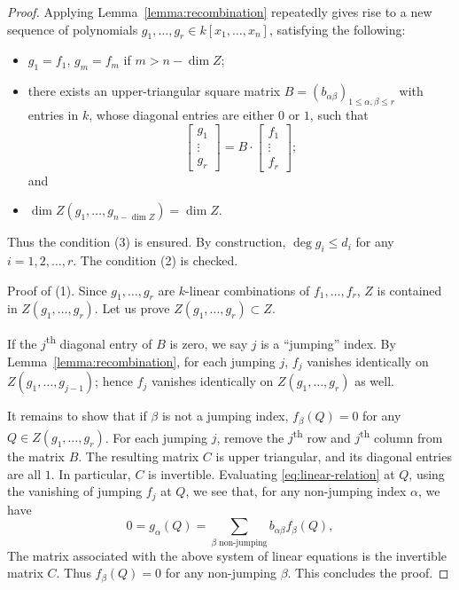 \documentclass{amsart}
\numberwithin{equation}{section}
\theoremstyle{plain}
\theoremstyle{definition}
\begin{document}
\begin{proof}
  Applying Lemma~\ref{lemma:recombination}
  repeatedly gives rise to a new sequence of polynomials
  \(g_1,\ldots,g_r \in k[x_1,\ldots,x_n]\), satisfying the following:
  \begin{itemize}
  \item
    \(g_1 = f_1\),
    \(g_m = f_m\) if \(m > n-\dim Z\);
  \item there exists an upper-triangular square matrix
    \(B = (b_{\alpha\beta})_{1\leq \alpha,\beta\leq r}\) with entries in \(k\),
    whose diagonal entries are either \(0\) or \(1\), such that
    \begin{equation}\label{eq:linear-relation}
      \begin{bmatrix}
        g_1 \\ \vdots \\ g_r
      \end{bmatrix}
      = B \cdot
      \begin{bmatrix}
        f_1 \\ \vdots \\ f_r
      \end{bmatrix};
    \end{equation}
    and
  \item \(\dim Z(g_1,\ldots,g_{n-\dim Z})=\dim Z\).
  \end{itemize}
  Thus the condition (3) is ensured.
  By construction, \(\deg g_i \leq d_i\) for any \(i=1,2,\ldots,r\). The
  condition (2) is checked.

  Proof of (1).
  Since \(g_1,\ldots,g_r\) are \(k\)-linear combinations of \(f_1,\ldots,f_r\),
  \(Z\) is contained in \(Z(g_1,\ldots,g_r)\). Let us prove
  \(Z(g_1,\ldots,g_r) \subset Z\).

  If the \(j\)\textsuperscript{th} diagonal entry of \(B\) is zero, we say \(j\) is a
  ``jumping'' index. By Lemma~\ref{lemma:recombination}, for each jumping \(j\),
  \(f_{j}\) vanishes identically on \(Z(g_1,\ldots,g_{j-1})\); hence \(f_j\)
  vanishes identically on \(Z(g_1,\ldots,g_r)\) as well.

  It remains to show that if \(\beta\) is not a jumping index,
  \(f_{\beta}(Q)=0\) for any \(Q \in Z(g_1,\ldots,g_r)\).
  For each jumping \(j\), remove the \(j\)\textsuperscript{th}
  row and \(j\)\textsuperscript{th} column from the matrix \(B\). The resulting
  matrix \(C\) is upper triangular, and its diagonal entries are all \(1\). In
  particular, \(C\) is invertible. Evaluating \eqref{eq:linear-relation} at
  \(Q\), using the vanishing of jumping \(f_j\) at \(Q\), we see that, for any
  non-jumping index \(\alpha\), we have
  \begin{equation*}
    0 = g_{\alpha}(Q) = \sum_{\beta \text{ non-jumping}} b_{\alpha\beta}f_{\beta}(Q),
  \end{equation*}
  The matrix associated with the above system of linear equations is the
  invertible matrix \(C\). Thus \(f_{\beta}(Q)=0\) for any non-jumping \(\beta\).
  This concludes the proof.
\end{proof}
\end{document}
